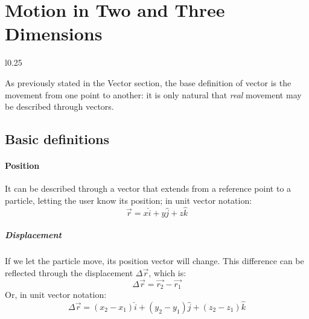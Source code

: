 \documentclass{scrartcl}
\begin{document}
    \section{Motion in Two and Three Dimensions}
    \begin{wrapfigure}{l}{0.25\textwidth}
        
    \end{wrapfigure}
    As previously stated in the Vector section, the base definition of vector is the movement from one point to another: it is only natural that \emph{real} movement may be described through vectors.
    \subsection{Basic definitions}
    \paragraph{Position} It can be described through a vector that extends from a reference point to a particle, letting the user know its position; in unit vector notation:
    \begin{equation}
        \vec{r} = x\hat{i}+y\hat{j}+z\hat{k}
    \end{equation}
    \subparagraph{Displacement} If we let the particle move, its position vector will change. This difference can be reflected through the displacement $\Delta\vec{r}$, which is:
    \begin{equation}
        \Delta\vec{r}= \vec{r_2} - \vec{r_1}
    \end{equation}
    Or, in unit vector notation:
    \begin{equation}
        \Delta\vec{r} = (x_2 - x_1) \hat{i} + (y_2 - y_1) \hat{j} + (z_2 - z_1) \hat{k}
    \end{equation}
\end{document}
